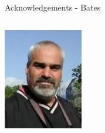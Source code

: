 \documentclass[aspectratio=169]{beamer}
\begin{document}
\begin{frame}{Acknowledgements - Bates}
\begin{columns}
            \includegraphics[width=0.8\textwidth]{people/bates/chris.png}
            
        \end{columns}   

\end{frame}
\end{document}
